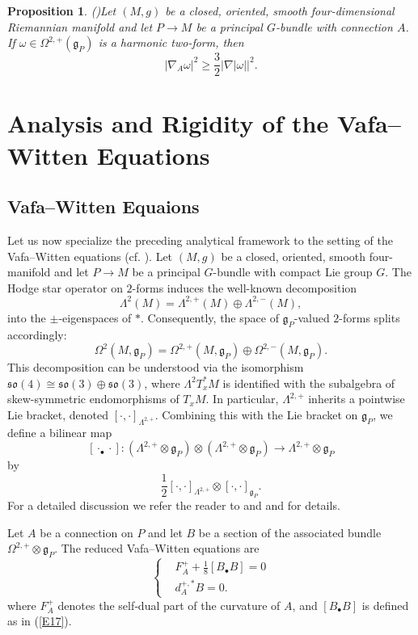 \documentclass[12pt, twoside]{article}
\newtheorem{proposition}[theorem]{Proposition}
\theoremstyle{definition}
\numberwithin{equation}{section}
\def \La {\Lambda}
\def\w {\omega}
\def\Om{\Omega}
\def\na {\nabla}
\begin{document}
\begin{proposition}(\cite[Proposition 2.8]{GKS18})\label{P3}
Let $(M,g)$ be a closed, oriented, smooth four-dimensional Riemannian manifold and let $P\rightarrow M$ be a principal $G$-bundle with connection $A$. If $\w\in\Om^{2,+}(\mathfrak{g}_{P})$ is a harmonic two-form, then 
\begin{equation}\label{E5}
|\na_{A}\w|^{2}\geq\frac{3}{2}|\na|\w||^{2}.
\end{equation}
\end{proposition}


\section{Analysis and Rigidity of the Vafa--Witten Equations}\label{sec:main} 

\subsection{Vafa--Witten Equaions}
Let us now specialize the preceding analytical framework to the setting of the Vafa--Witten equations (cf. \cite{Mar10,Tan17}).  Let $(M,g)$ be a closed, oriented, smooth four-manifold and let $P\to M$ be a principal $G$-bundle with compact Lie group $G$. The Hodge star operator on $2$-forms induces the well-known decomposition
 \[\La^{2}(M)=\La^{2,+}(M)\oplus\La^{2,-}(M),\]
into the $\pm$-eigenspaces of $\ast$. Consequently, the space of $\mathfrak{g}_P$-valued $2$-forms splits accordingly:
\[\Om^{2}(M,\mathfrak{g}_{P})=\Om^{2,+}(M,\mathfrak{g}_{P})\oplus\Om^{2,-}(M,\mathfrak{g}_{P}).\]
This decomposition can be understood via the isomorphism $\mathfrak{so}(4)\cong\mathfrak{so}(3)\oplus\mathfrak{so}(3)$, where $\Lambda^{2}T_{x}^{\ast}M$ is identified with the subalgebra of skew-symmetric endomorphisms of $T_{x}M$. In particular, $\Lambda^{2,+}$ inherits a pointwise Lie bracket, denoted $[\cdot,\cdot]_{\Lambda^{2,+}}$. Combining this with the Lie bracket on $\mathfrak{g}_P$, we define a bilinear map
\[ [\cdot_{\bullet}\cdot]:(\La^{2,+}\otimes\mathfrak{g}_{P})\otimes(\La^{2,+}\otimes\mathfrak{g}_{P})\rightarrow\La^{2,+}\otimes\mathfrak{g}_{P}
\]
by
\begin{equation}\label{E17} \frac{1}{2}[\cdot,\cdot]_{\La^{2,+}}\otimes[\cdot,\cdot]_{\mathfrak{g}_{P}}.
\end{equation}
For a detailed discussion we refer the reader to  \cite[Section 2]{Tan17} and \cite[Appendix A]{Mar10} and for details.

Let $A$ be a connection on $P$ and let $B$ be a section of the associated bundle $\Om^{2,+}\otimes\mathfrak{g}_{P}$. The reduced Vafa–Witten equations are 
\begin{equation*}
\left\{
\begin{split}
&F_{A}^{+}+\frac{1}{8}[B_{\bullet}B]=0\\
& d_{A}^{+,\ast}B=0.
\end{split}
\right.
\end{equation*}  
where $F_{A}^{+}$ denotes the self‑dual part of the curvature of $A$, and $[B_{\bullet}B]$ is defined as in (\ref{E17}).
\end{document}
